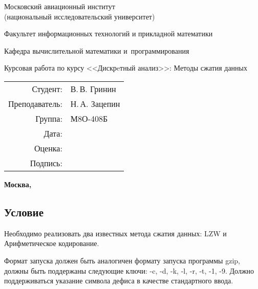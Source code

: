 \documentclass[12pt]{article}
\begin{document}
\begin{titlepage}
	\begin{center}
		\bfseries
		
		{\Large Московский авиационный институт\\ (национальный исследовательский университет)
			
		}
		
		\vspace{48pt}
		
		{\large Факультет информационных технологий и прикладной математики
		}
		
		\vspace{36pt}
		
		
		{\large Кафедра вычислительной математики и~программирования
			
		}
		
		
		\vspace{48pt}
		
		Курсовая работа по курсу <<Дискрeтный анализ>>: Методы сжатия данных
	\end{center}
	
	\vspace{72pt}
	
	\begin{flushright}
		\begin{tabular}{rl}
			Студент: & В.\,В. Гринин  \\
			Преподаватель: & Н.\,А. Зацепин \\
			Группа: & М8О-408Б \\
			Дата: & \\
			Оценка: & \\
			Подпись: & \\
		\end{tabular}
	\end{flushright}
	
	\vfill
	
	\begin{center}
		\bfseries
		Москва, \the\year
	\end{center}
\end{titlepage}

\pagebreak

\subsection*{Условие}

Необходимо реализовать два известных метода сжатия данных: LZW и Арифметическое кодирование. 

Формат запуска должен быть аналогичен формату запуска программы gzip, должны быть поддержаны следующие ключи: -c, -d, -k, -l, -r, -t, -1, -9. Должно поддерживаться указание символа дефиса в качестве стандартного ввода.
\end{document}
